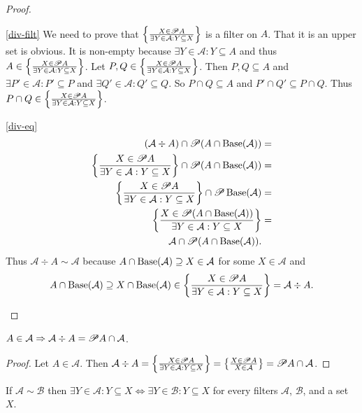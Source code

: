 \begin{proof}
~
\begin{widedisorder}
\item [{\ref{div-filt}}] We need to prove that $\left\{ \frac{X\in\mathscr{P} A}{\exists Y\in\mathcal{A}:Y\subseteq X}\right\}$
is a filter on $A$. That it is an upper set is obvious. It is non-empty
because $\exists Y\in\mathcal{A}:Y\subseteq A$ and thus $A\in\left\{ \frac{X\in\mathscr{P} A}{\exists Y\in\mathcal{A}:Y\subseteq X}\right\}$.
Let $P,Q\in\left\{ \frac{X\in\mathscr{P} A}{\exists Y\in\mathcal{A}:Y\subseteq X}\right\}$.
Then $P,Q\subseteq A$ and $\exists P'\in\mathcal{A}:P'\subseteq P$
and $\exists Q'\in\mathcal{A}:Q'\subseteq Q$. So $P\cap Q\subseteq A$
and $P'\cap Q'\subseteq P\cap Q$. Thus $P\cap Q\in\left\{ \frac{X\in\mathscr{P} A}{\exists Y\in\mathcal{A}:Y\subseteq X}\right\}$.
\item [{\ref{div-eq}}] ~
\begin{align*}
(\mathcal{A}\div A)\cap\mathscr{P}(A\cap\operatorname{Base}(\mathcal{A})) & =\\
\left\{ \frac{X\in\mathscr{P} A}{\exists Y\in\mathcal{A}:Y\subseteq X}\right\}\cap\mathscr{P}(A\cap\operatorname{Base}(\mathcal{A})) & =\\
\left\{ \frac{X\in\mathscr{P} A}{\exists Y\in\mathcal{A}:Y\subseteq X}\right\}\cap\mathscr{P}\operatorname{Base}(\mathcal{A}) & =\\
\left\{ \frac{X\in\mathscr{P}(A\cap\operatorname{Base}(\mathcal{A}))}{\exists Y\in\mathcal{A}:Y\subseteq X}\right\} & =\\
\mathcal{A}\cap\mathscr{P}(A\cap\operatorname{Base}(\mathcal{A})).
\end{align*}
Thus $\mathcal{A}\div A\sim\mathcal{A}$ because $A\cap\operatorname{Base}(\mathcal{A})\supseteq X\in\mathcal{A}$
for some $X\in\mathcal{A}$ and 
\[
A\cap\operatorname{Base}(\mathcal{A})\supseteq X\cap\operatorname{Base}(\mathcal{A})\in\left\{ \frac{X\in\mathscr{P} A}{\exists Y\in\mathcal{A}:Y\subseteq X}\right\}=\mathcal{A}\div A.
\]

\end{widedisorder}
\end{proof}
\begin{prop}
$A\in\mathcal{A}\Rightarrow\mathcal{A}\div A=\mathscr{P} A\cap\mathcal{A}$.\end{prop}
\begin{proof}
Let $A\in\mathcal{A}$. Then $\mathcal{A}\div A=\left\{ \frac{X\in\mathscr{P} A}{\exists Y\in\mathcal{A}:Y\subseteq X}\right\}=\left\{ \frac{X\in\mathscr{P} A}{X\in\mathcal{A}}\right\}=\mathscr{P}A\cap\mathcal{A}$.\end{proof}
\begin{lem}
If $\mathcal{A}\sim\mathcal{B}$ then $\exists Y\in\mathcal{A}:Y\subseteq X\Leftrightarrow\exists Y\in\mathcal{B}:Y\subseteq X$
for every filters $\mathcal{A}$, $\mathcal{B}$, and a set $X$.\end{lem}
